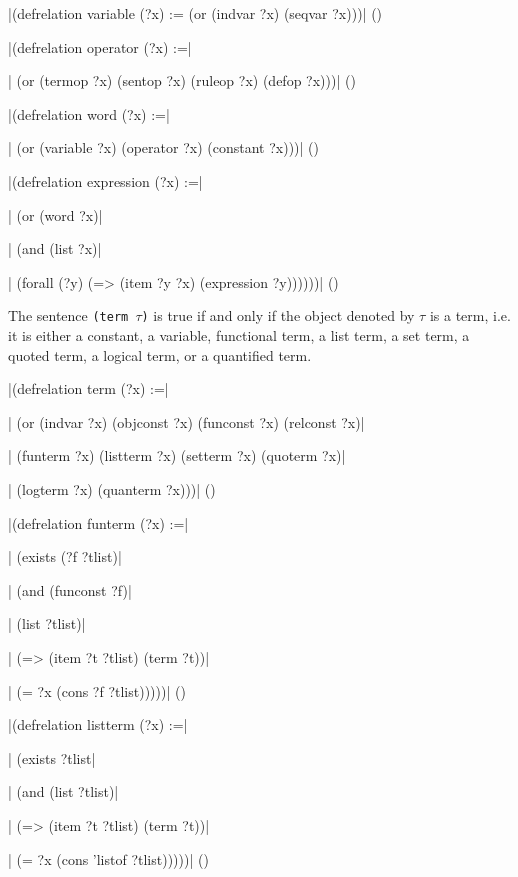 \medskip
\verbatim|(defrelation variable (?x) := (or (indvar ?x) (seqvar ?x)))|
\hfill(\equation)\par
\medskip

\medskip
\verbatim|(defrelation operator (?x) :=|\par
\verbatim|  (or (termop ?x) (sentop ?x) (ruleop ?x) (defop ?x)))|
\hfill(\equation)\par
\medskip

\medskip
\verbatim|(defrelation word (?x) :=|\par
\verbatim|  (or (variable ?x) (operator ?x) (constant ?x)))|
\hfill(\equation)\par
\medskip

\medskip
\verbatim|(defrelation expression (?x) :=|\par
\verbatim|  (or (word ?x)|\par
\verbatim|      (and (list ?x)|\par
\verbatim|           (forall (?y) (=> (item ?y ?x) (expression ?y))))))|
\hfill(\equation)\par
\medskip


The sentence {\tt (term $\tau$)} is true if and only if the
object denoted by $\tau$ is a term, i.e. it is either a constant, a
variable, functional term, a list term, a set term, a quoted term, a logical
term, or a quantified term.

\medskip
\verbatim|(defrelation term (?x) :=|\par
\verbatim|  (or (indvar ?x) (objconst ?x) (funconst ?x) (relconst ?x)|\par
\verbatim|      (funterm ?x) (listterm ?x) (setterm ?x) (quoterm ?x)|\par
\verbatim|      (logterm ?x) (quanterm ?x)))|
\hfill(\equation)\par
\medskip

\medskip
\verbatim|(defrelation funterm (?x) :=|\par
\verbatim|  (exists (?f ?tlist)|\par
\verbatim|    (and (funconst ?f)|\par
\verbatim|         (list ?tlist)|\par
\verbatim|         (=> (item ?t  ?tlist) (term ?t))|\par
\verbatim|         (= ?x (cons ?f ?tlist)))))|
\hfill(\equation)\par
\medskip

\medskip
\verbatim|(defrelation listterm (?x) :=|\par
\verbatim|  (exists ?tlist|\par
\verbatim|    (and (list ?tlist)|\par
\verbatim|         (=> (item ?t  ?tlist) (term ?t))|\par
\verbatim|         (= ?x (cons 'listof ?tlist)))))|
\hfill(\equation)\par
\medskip

